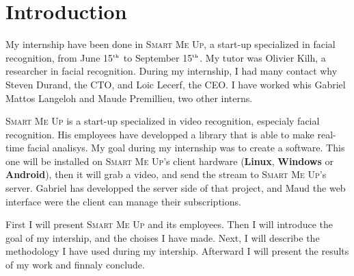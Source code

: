 \documentclass[a4paper,11pt]{custom}
\newcommand{\smu}{\textsc{Smart Me Up}}
\newcommand{\linux}{\textbf{Linux}\xspace}
\newcommand{\win}{\textbf{Windows}\xspace}
\newcommand{\android}{\textbf{Android}\xspace}
\newcommand{\nth}[1]{#1$^{\text{\tiny th}\xspace}$}
\begin{document}


\chapter{Introduction}

My internship have been done in \smu, a start-up specialized in facial
recognition, from June \nth{15} to September \nth{15}. My tutor was Olivier
Kilh, a researcher in facial recognition. During my internship, I had many
contact why Steven Durand, the CTO, and Loic Lecerf, the CEO. I have worked whis
Gabriel Mattos Langeloh and Maude Premillieu, two other interns.

\smu{} is a start-up specialized in video recognition, especialy facial
recognition. His employees have developped a library that is able to make
real-time facial analisys. My goal during my internship was to create a
software. This one will be installed on \smu's client hardware (\linux, \win{}
or \android), then it will grab a video, and send the stream to \smu's server.
Gabriel has developped the server side of that project, and Maud the web
interface were the client can manage their subscriptions.

First I will present \smu{} and its employees. Then I will introduce the goal of
my intership, and the choises I have made. Next, I will describe the
methodology I have used during my intership. Afterward I will present the
results of my work and finnaly conclude.

\vspace{\fill}
\end{document}
